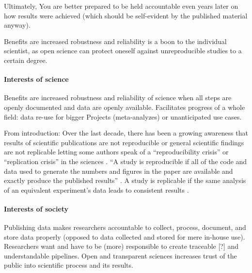 %
Ultimately, You are better prepared to be held accountable even years later on
how results were achieved (which should be self-evident by the published
material anyway).

%
Benefits are increased robustness and reliability is a boon to the individual
scientist, as open science can protect oneself against unreproducible studies to
a certain degree.



\paragraph{Interests of science}


%
Benefits are increased robustness and reliability of science when all steps are
openly documented and data are openly available.
%
Facilitates progress of a whole field: data re-use for bigger Projects
(meta-analyzes) or unanticipated use cases.

From introduction:
Over the last decade, there has been a growing awareness that results of
scientific publications are not reproducible or general scientific findings are
not replicable letting some authors speak of a ``reproducibility crisis'' or
``replication crisis'' in the sciences \citep{baker2016reproducibility,
plesser2018reproducibility, stupple2019reproducibility, nosek2022replicability}.
``A study is reproducible if all of the code and data used to generate the
numbers and figures in the paper are available and exactly produce the published
results'' \citep{leek2017most}.
A study is replicable if the same analysis of an equivalent experiment's data
leads to consistent results \citep{dubois2016building, leek2017most}.



\paragraph{Interests of society}

%
Publishing data makes researchers accountable to collect, process, document, and
store data properly (opposed to data collected and stored for mere in-house
use).
%
Researchers want and have to be (more) responsible to create traceable [?] and
understandable pipelines.
%
Open and transparent sciences increases trust of the public into scientific
process and its results.



